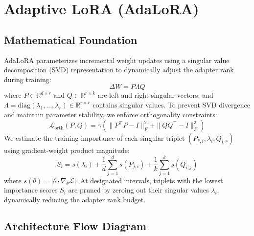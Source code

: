 \newpage
\section{Adaptive LoRA (AdaLoRA)}

\subsection{Mathematical Foundation}
AdaLoRA parameterizes incremental weight updates using a singular value decomposition (SVD) representation to dynamically adjust the adapter rank during training:
\begin{equation}
  \Delta W = P \Lambda Q
\end{equation}
where $P \in \mathbb{R}^{d \times r}$ and $Q \in \mathbb{R}^{r \times k}$ are left and right singular vectors, and $\Lambda = \text{diag}(\lambda_1, \dots, \lambda_r) \in \mathbb{R}^{r \times r}$ contains singular values.
To prevent SVD divergence and maintain parameter stability, we enforce orthogonality constraints:
\begin{equation}
  \mathcal{L}_{\text{orth}}(P, Q) = \gamma \left( \|P^\top P - I\|_F^2 + \|Q Q^\top - I\|_F^2 \right)
\end{equation}
We estimate the training importance of each singular triplet $(P_{*,i}, \lambda_i, Q_{i,*})$ using gradient-weight product magnitude:
\begin{equation}
  S_i = s(\lambda_i) + \frac{1}{d} \sum_{j=1}^d s(P_{j,i}) + \frac{1}{k} \sum_{j=1}^k s(Q_{i,j})
\end{equation}
where $s(\theta) = |\theta \cdot \nabla_\theta \mathcal{L}|$. At designated intervals, triplets with the lowest importance scores $S_i$ are pruned by zeroing out their singular values $\lambda_i$, dynamically reducing the adapter rank budget.

\subsection{Architecture Flow Diagram}

